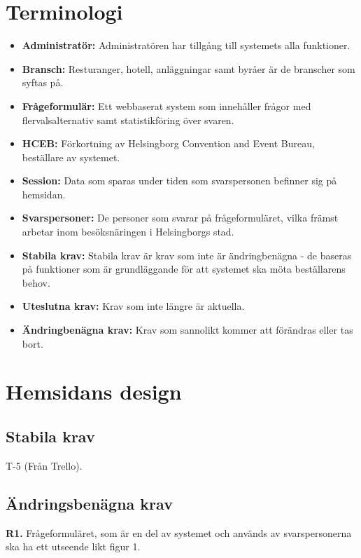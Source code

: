 \documentclass{article}
\begin{document}
    \section{Terminologi}
    \begin{itemize}
        \item \textbf{Administratör:} Administratören har tillgång till systemets alla funktioner.
        \item \textbf{Bransch:} Resturanger, hotell, anläggningar samt byråer är de branscher som syftas på.
         \item \textbf{Frågeformulär:} Ett webbaserat system som innehåller frågor med flervalsalternativ samt statistikföring över svaren.
        \item \textbf{HCEB:} Förkortning av Helsingborg Convention and Event Bureau, beställare av systemet.
        \item \textbf{Session:} Data som sparas under tiden som svarspersonen befinner sig på hemsidan.
        \item \textbf{Svarspersoner:}  De personer som svarar på frågeformuläret, vilka främst arbetar inom besöksnäringen i Helsingborgs stad. 
        \item\textbf{Stabila krav:}  Stabila krav är krav som inte är ändringbenägna - de baseras på funktioner som är grundläggande för att systemet ska möta beställarens behov.
         \item \textbf{Uteslutna krav:}  Krav som inte längre är aktuella.
        \item \textbf{Ändringbenägna krav:}  Krav som sannolikt kommer att förändras eller tas bort.
       
    \end{itemize}
    \newpage
    \section{Hemsidans design}
    
    \subsection{Stabila krav}
    
    T-5 (Från Trello).
     
    \subsection{Ändringsbenägna krav}
    
    \large{\textbf{R1.}}
    \normalsize{Frågeformuläret, som är en del av systemet och används av svarspersonerna ska ha ett utseende likt figur 1.}
    
\end{document}
